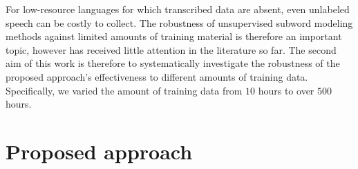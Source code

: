 \documentclass[a4paper]{article}
\begin{document}


For low-resource languages for which transcribed data are absent, 
even unlabeled speech can be costly to collect. The robustness of unsupervised subword modeling methods
against limited amounts of training material is therefore an important topic, however has received little attention in the literature so far. The second aim of this work is therefore to systematically investigate the robustness 
of the proposed approach's effectiveness to different amounts of training data. Specifically, we varied the amount of training data from $10$ hours to over $500$ hours.
 


\section{Proposed approach}
\end{document}
